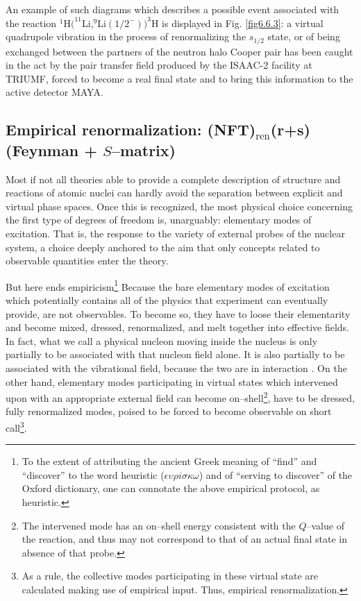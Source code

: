 An example of such diagrams which describes a possible event associated with the reaction $^1$H$(^{11}$Li,$^9$Li$(1/2^-))^3$H is displayed in Fig. \ref{fig6.6.3}: a virtual quadrupole vibration in the process of renormalizing the $s_{1/2}$ state, or of being exchanged between the partners of the neutron halo Cooper pair has been caught in the act by the pair transfer field produced by the ISAAC-2 facility at TRIUMF, forced to become a real final state and to bring this information to the active detector MAYA.
\subsection{Empirical renormalization: (NFT)$_{\text{ren}}$(r+s) (Feynman + $S$--matrix)} 
Most if not all theories able to provide a complete description of structure and reactions of atomic nuclei can hardly avoid the separation between explicit and virtual phase spaces. Once this is recognized, the most physical choice concerning the first type of degrees of freedom is, unarguably: elementary modes of excitation. That is, the response to the variety of external probes of the nuclear system, a choice deeply anchored to the aim that only concepts related to observable quantities enter the theory.

But here ends empiricism\footnote{To the extent of attributing the ancient Greek meaning of ``find'' and ``discover'' to the word heuristic ($\epsilon\upsilon\rho i \sigma\kappa\omega$) and of ``serving to discover'' of the Oxford dictionary, one can connotate the above empirical protocol, as heuristic.} Because the bare elementary modes of excitation which potentially contains all of the physics that experiment can eventually provide, are not observables. To become so, they have to loose their elementarity and become mixed, dressed, renormalized, and melt together into effective fields. In fact, what we call a physical nucleon moving inside the nucleus is only partially to be associated with that nucleon field alone. It is also partially to be associated with the vibrational field, because the two are in interaction . On the other hand, elementary modes participating in virtual states which intervened upon with an appropriate external field can become on--shell\footnote{The intervened mode has an on--shell energy consistent with the $Q$--value of the reaction, and thus may not correspond to that of an actual final state in absence of that probe.\label{footnote2}}, have to be dressed, fully renormalized modes, poised to be forced to become observable on short call\footnote{As a rule, the collective modes participating in these virtual state are calculated making use of empirical input. Thus, empirical renormalization.}.


